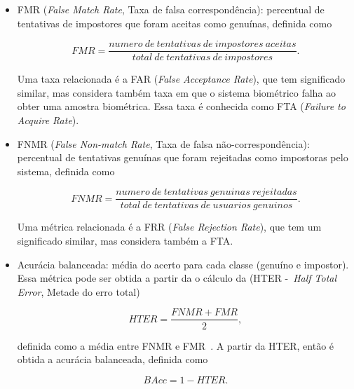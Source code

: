 \begin{itemize}
    \item FMR (\textit{False Match Rate}, Taxa de falsa correspondência): percentual de tentativas de impostores que foram aceitas como genuínas, definida como

          \begin{equation}\label{eqn:fmr}
              FMR = \frac{numero\:de\:tentativas\:de\:impostores\:aceitas}{total\:de\:tentativas\:de\:impostores}.
          \end{equation}

          Uma taxa relacionada é a FAR (\textit{False Acceptance Rate}), que tem significado similar, mas considera também taxa em que o sistema biométrico falha ao obter uma amostra biométrica. Essa taxa é conhecida como FTA (\textit{Failure to Acquire Rate}).


    \item FNMR (\textit{False Non-match Rate}, Taxa de falsa não-correspondência): percentual de tentativas genuínas que foram rejeitadas como impostoras pelo sistema, definida como

          \begin{equation}\label{eqn:fnmr}
              FNMR = \frac{numero\:de\:tentativas\:genuinas\:rejeitadas}{total\:de\:tentativas\:de\:usuarios\:genuinos}.
          \end{equation}

          Uma métrica relacionada é a FRR (\textit{False Rejection Rate}), que tem um significado similar, mas considera também a FTA.

    \item Acurácia balanceada: média do acerto para cada classe (genuíno e impostor). Essa métrica pode ser obtida a partir da o cálculo da (HTER -~\textit{Half Total Error}, Metade do erro total)

          \begin{equation}\label{eqn:hter}
              HTER = \frac{FNMR + FMR}{2},
          \end{equation}

          definida como a média entre FNMR e FMR~\cite{Roy2022systematic}. A partir da HTER, então é obtida a acurácia balanceada, definida como

          \begin{equation}\label{eqn:bacc}
              BAcc = 1 - HTER.
          \end{equation}

\end{itemize}


